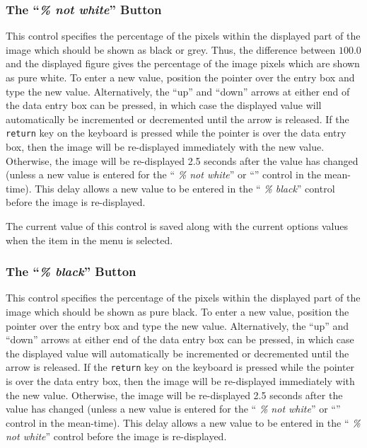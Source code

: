 \subsubsection {The ``{\em \% not white}'' Button}
This control specifies the percentage of the pixels within the displayed
part of the image which should be shown as black or grey. Thus, the
difference between $100.0$ and the displayed figure gives the percentage
of the image pixels which are shown as pure white. To enter a new value,
position the pointer over the entry box and type the new value.
Alternatively, the ``up'' and ``down'' arrows at either end of the data
entry box can be pressed, in which case the displayed value will
automatically be incremented or decremented until the arrow is released.
If the {\tt return} key on the keyboard is pressed while the pointer is
over the data entry box, then the image will be re-displayed immediately
with the new value. Otherwise, the image will be re-displayed 2.5 seconds
after the value has changed (unless a new value is entered for the ``{\em
\% not white}'' or ``'' control in
the mean-time). This delay allows a new value to be entered in the ``{\em
\% black}'' control before the image is re-displayed.

The current value of this control is saved along with the current options
values when the  item in
the  menu is selected.

\subsubsection {The ``{\em \% black}'' Button}
This control specifies the percentage of the pixels within the displayed
part of the image which should be shown as pure black. To enter a new value,
position the pointer over the entry box and type the new value.
Alternatively, the ``up'' and ``down'' arrows at either end of the data
entry box can be pressed, in which case the displayed value will
automatically be incremented or decremented until the arrow is released.
If the {\tt return} key on the keyboard is pressed while the pointer is
over the data entry box, then the image will be re-displayed immediately
with the new value. Otherwise, the image will be re-displayed 2.5 seconds
after the value has changed (unless a new value is entered for the ``{\em
\% not white}'' or ``'' control in
the mean-time). This delay allows a new value to be entered in the ``{\em
\% not white}'' control before the image is re-displayed.

